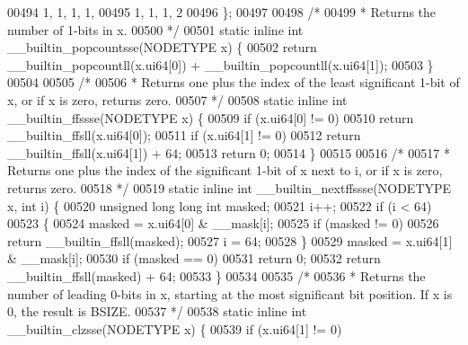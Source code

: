 \begin{DoxyCode}
00494         1, 1, 1, 1,
00495         1, 1, 1, 2
00496 \};
00497 
00498 \textcolor{comment}{/*}
00499 \textcolor{comment}{ * Returns the number of 1-bits in x.}
00500 \textcolor{comment}{ */}
00501 \textcolor{keyword}{static} \textcolor{keyword}{inline} \textcolor{keywordtype}{int} \_\_builtin\_popcountsse(NODETYPE x) \{
00502         \textcolor{keywordflow}{return} \_\_builtin\_popcountll(x.ui64[0]) + \_\_builtin\_popcountll(x.ui64[1]);
00503 \}
00504 
00505 \textcolor{comment}{/*}
00506 \textcolor{comment}{ * Returns one plus the index of the least significant 1-bit of x, or if x is zero, returns zero.}
00507 \textcolor{comment}{ */}
00508 \textcolor{keyword}{static} \textcolor{keyword}{inline} \textcolor{keywordtype}{int} \_\_builtin\_ffssse(NODETYPE x) \{
00509         \textcolor{keywordflow}{if} (x.ui64[0] != 0)
00510                 \textcolor{keywordflow}{return} \_\_builtin\_ffsll(x.ui64[0]);
00511         \textcolor{keywordflow}{if} (x.ui64[1] != 0)
00512                 \textcolor{keywordflow}{return} \_\_builtin\_ffsll(x.ui64[1]) + 64;
00513         \textcolor{keywordflow}{return} 0;
00514 \}
00515 
00516 \textcolor{comment}{/*}
00517 \textcolor{comment}{ * Returns one plus the index of the significant 1-bit of x next to i, or if x is zero, returns zero.}
00518 \textcolor{comment}{ */}
00519 \textcolor{keyword}{static} \textcolor{keyword}{inline} \textcolor{keywordtype}{int} \_\_builtin\_nextffssse(NODETYPE x, \textcolor{keywordtype}{int} i) \{
00520         \textcolor{keywordtype}{unsigned} \textcolor{keywordtype}{long} \textcolor{keywordtype}{long} \textcolor{keywordtype}{int} masked;
00521         i++;
00522         \textcolor{keywordflow}{if} (i < 64)
00523         \{
00524                 masked = x.ui64[0] & \_\_mask[i];
00525                 \textcolor{keywordflow}{if} (masked != 0)
00526                         \textcolor{keywordflow}{return} \_\_builtin\_ffsll(masked);
00527                 i = 64;
00528         \}
00529         masked = x.ui64[1] & \_\_mask[i];
00530         \textcolor{keywordflow}{if} (masked == 0)
00531                 \textcolor{keywordflow}{return} 0;
00532         \textcolor{keywordflow}{return} \_\_builtin\_ffsll(masked) + 64;
00533 \}
00534 
00535 \textcolor{comment}{/*}
00536 \textcolor{comment}{ * Returns the number of leading 0-bits in x, starting at the most significant bit position. If x is 0, the
       result is BSIZE.}
00537 \textcolor{comment}{ */}
00538 \textcolor{keyword}{static} \textcolor{keyword}{inline} \textcolor{keywordtype}{int} \_\_builtin\_clzsse(NODETYPE x) \{
00539         \textcolor{keywordflow}{if} (x.ui64[1] != 0)

\end{DoxyCode}

